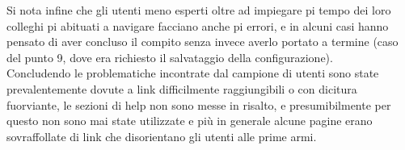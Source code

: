 Si nota infine che gli utenti meno esperti oltre ad impiegare pi tempo dei loro colleghi pi abituati a navigare facciano anche pi errori, e in alcuni casi hanno pensato di aver concluso il compito senza invece averlo portato a termine (caso del punto 9, dove era richiesto il salvataggio della configurazione).\\
Concludendo le problematiche incontrate dal campione di utenti sono state prevalentemente dovute a link difficilmente raggiungibili o con dicitura fuorviante, le sezioni di help non sono messe in risalto, e presumibilmente per questo non sono mai state utilizzate e più in generale alcune pagine erano sovraffollate di link che disorientano gli utenti alle prime armi.